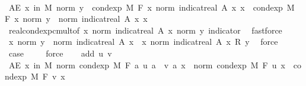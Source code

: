 \begin{isabellebody}
\ \ \isamarkupfalse%
\ \isamarkupfalse%
\ {\isachardoublequoteopen}AE\ x\ in\ M{\isachardot}{\kern0pt}\ norm\ y\ {\isacharasterisk}{\kern0pt}\ cond{\isacharunderscore}{\kern0pt}exp\ M\ F\ {\isacharparenleft}{\kern0pt}{\isasymlambda}x{\isachardot}{\kern0pt}\ norm\ {\isacharparenleft}{\kern0pt}indicat{\isacharunderscore}{\kern0pt}real\ A\ x{\isacharparenright}{\kern0pt}{\isacharparenright}{\kern0pt}\ x\ {\isacharequal}{\kern0pt}\ cond{\isacharunderscore}{\kern0pt}exp\ M\ F\ {\isacharparenleft}{\kern0pt}{\isasymlambda}x{\isachardot}{\kern0pt}\ norm\ y\ {\isacharasterisk}{\kern0pt}\ norm\ {\isacharparenleft}{\kern0pt}indicat{\isacharunderscore}{\kern0pt}real\ A\ x{\isacharparenright}{\kern0pt}{\isacharparenright}{\kern0pt}\ x{\isachardoublequoteclose}\ \isamarkupfalse%
\ real{\isacharunderscore}{\kern0pt}cond{\isacharunderscore}{\kern0pt}exp{\isacharunderscore}{\kern0pt}cmult{\isacharbrackleft}{\kern0pt}of\ {\isachardoublequoteopen}{\isasymlambda}x{\isachardot}{\kern0pt}\ norm\ {\isacharparenleft}{\kern0pt}indicat{\isacharunderscore}{\kern0pt}real\ A\ x{\isacharparenright}{\kern0pt}{\isachardoublequoteclose}\ {\isachardoublequoteopen}norm\ y{\isachardoublequoteclose}{\isacharbrackright}{\kern0pt}\ indicator\ \isamarkupfalse%
\ fastforce\isanewline
\ \ \isamarkupfalse%
\ \isamarkupfalse%
\ {\isachardoublequoteopen}{\isacharparenleft}{\kern0pt}{\isasymlambda}x{\isachardot}{\kern0pt}\ norm\ y\ {\isacharasterisk}{\kern0pt}\ norm\ {\isacharparenleft}{\kern0pt}indicat{\isacharunderscore}{\kern0pt}real\ A\ x{\isacharparenright}{\kern0pt}{\isacharparenright}{\kern0pt}\ {\isacharequal}{\kern0pt}\ {\isacharparenleft}{\kern0pt}{\isasymlambda}x{\isachardot}{\kern0pt}\ norm\ {\isacharparenleft}{\kern0pt}indicat{\isacharunderscore}{\kern0pt}real\ A\ x\ {\isacharasterisk}{\kern0pt}\isactrlsub R\ y{\isacharparenright}{\kern0pt}{\isacharparenright}{\kern0pt}{\isachardoublequoteclose}\ \isamarkupfalse%
\ force\isanewline
\ \ \isamarkupfalse%
\ \isamarkupfalse%
\ {\isacharquery}{\kern0pt}case\ \isamarkupfalse%
\ {\isacharasterisk}{\kern0pt}\ \isamarkupfalse%
\ force\isanewline
{}\isamarkupfalse%
\isanewline
\ \ \isamarkupfalse%
\ {\isacharparenleft}{\kern0pt}add\ u\ v{\isacharparenright}{\kern0pt}\isanewline
\ \ \isamarkupfalse%
\ {\isachardoublequoteopen}AE\ x\ in\ M{\isachardot}{\kern0pt}\ norm\ {\isacharparenleft}{\kern0pt}cond{\isacharunderscore}{\kern0pt}exp\ M\ F\ {\isacharparenleft}{\kern0pt}{\isasymlambda}a{\isachardot}{\kern0pt}\ u\ a\ {\isacharplus}{\kern0pt}\ v\ a{\isacharparenright}{\kern0pt}\ x{\isacharparenright}{\kern0pt}\ {\isacharequal}{\kern0pt}\ norm\ {\isacharparenleft}{\kern0pt}cond{\isacharunderscore}{\kern0pt}exp\ M\ F\ u\ x\ {\isacharplus}{\kern0pt}\ cond{\isacharunderscore}{\kern0pt}exp\ M\ F\ v\ x{\isacharparenright}{\kern0pt}{\isachardoublequoteclose}\ \isamarkupfalse%

\end{isabellebody}

